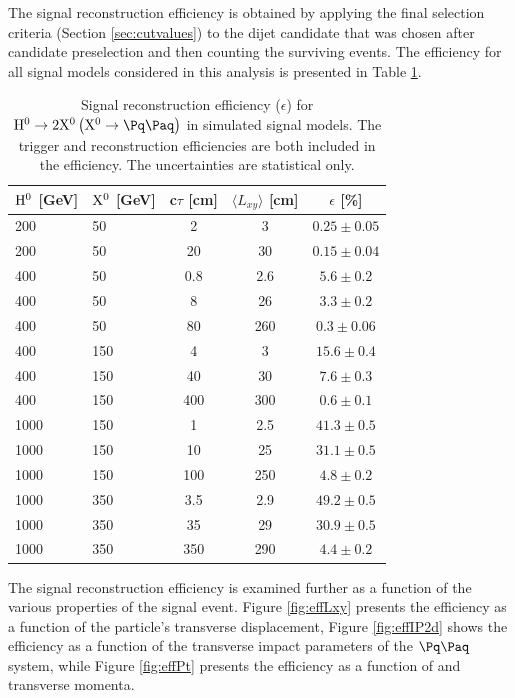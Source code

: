 The signal reconstruction efficiency is obtained by applying the final selection
criteria (Section \ref{sec:cutvalues}) to the dijet candidate that was chosen 
after candidate preselection and then counting the surviving events.
The efficiency for all signal models considered in this analysis
is presented in Table 
\ref{tab:sigeff}. 

\begin{table}[htbp]
\caption{
Signal reconstruction efficiency ($\epsilon$) for $\Higgs \to 2\X \left(\X \to \qq\right)$ 
in simulated signal models.
The trigger and reconstruction efficiencies are both included in the efficiency.
The uncertainties are statistical only.\label{tab:sigeff}}
\centering
\begin{tabular}{llccc}
\hline
$\mathrm{H}^{0}$ [GeV] & $\mathrm{X^{0}}$ [GeV] & c$\tau$ [cm] & $\langle L_{xy} \rangle$ [cm] & $\epsilon$ [\%] \\
\hline
200 & 50 & 2 & 3 & $0.25 \pm 0.05$ \\
200 & 50 & 20 & 30 & $0.15 \pm 0.04$ \\
\hline
400 & 50 & 0.8 & 2.6 & $5.6 \pm 0.2$ \\
400 & 50 & 8 & 26 &  $3.3 \pm 0.2$ \\
400 & 50 & 80 & 260 & $0.3 \pm 0.06$ \\
\hline
400 & 150 & 4 & 3 & $15.6 \pm 0.4$ \\
400 & 150 & 40 & 30 & $7.6 \pm 0.3$ \\
400 & 150 & 400 & 300 & $0.6 \pm 0.1$ \\
\hline
1000 & 150 & 1 & 2.5 & $41.3 \pm 0.5$ \\
1000 & 150 & 10 & 25 & $31.1 \pm 0.5$ \\
1000 & 150 & 100 & 250 & $4.8 \pm 0.2$ \\
\hline
1000 & 350 & 3.5 & 2.9 & $49.2 \pm 0.5$ \\
1000 & 350 & 35 & 29 & $30.9 \pm 0.5$ \\
1000 & 350 & 350 & 290 & $4.4 \pm 0.2$ \\
\hline

\end{tabular}
\end{table}

The signal reconstruction efficiency is examined further as a function of the various
properties of the signal event. 
Figure \ref{fig:effLxy} presents the efficiency as a function of the \X particle's
transverse displacement, Figure \ref{fig:effIP2d} shows the efficiency as a function of
the transverse impact parameters of the $\qq$ system, while Figure \ref{fig:effPt} presents
the efficiency as a function of \Higgs and \X transverse momenta.

